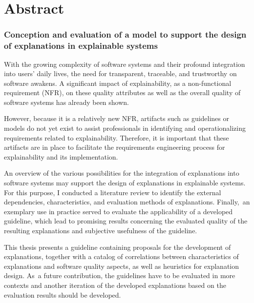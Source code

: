 \clearpage

\chapter*{Abstract}

\subsection*{Conception and evaluation of a model to support the design of explanations in explainable systems}

With the growing complexity of software systems and their profound integration into users' daily lives, the need for transparent, traceable, and trustworthy on software awakens. A significant impact of explainability, as a non-functional requirement (NFR), on these quality attributes as well as the overall quality of software systems has already been shown.

However, because it is a relatively new NFR, artifacts such as guidelines or models do not yet exist to assist professionals in identifying and operationalizing requirements related to explainability. Therefore, it is important that these artifacts are in place to facilitate the requirements engineering process for explainability and its implementation.

An overview of the various possibilities for the integration of explanations into software systems may support the design of explanations in explainable systems. For this purpose, I conducted a literature review to identify the external dependencies, characteristics, and evaluation methods of explanations. Finally, an exemplary use in practice served to evaluate the applicability of a developed guideline, which lead to promising results concerning the evaluated quality of the resulting explanations and subjective usefulness of the guideline. 

This thesis presents a guideline containing proposals for the development of explanations, together with a catalog of correlations between characteristics of explanations and software quality aspects, as well as heuristics for explanation design. As a future contribution, the guidelines have to be evaluated in more contexts and another iteration of the developed explanations based on the evaluation results should be developed.

\clearpage